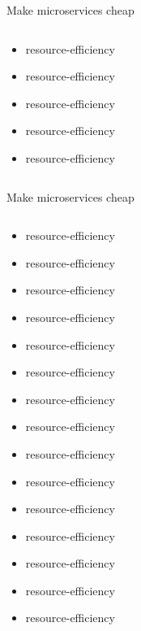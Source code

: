 \documentclass{beamer}
\begin{document}
\begin{frame}{Make microservices cheap}
\begin{columns}
\begin{column}{0.36\textwidth}
\begin{itemize}
                \item resource-efficiency
                \item resource-efficiency
                \item resource-efficiency
                \item resource-efficiency
                \item resource-efficiency
            \end{itemize}
        \end{column}
        \begin{column}{0.36\textwidth}
        \end{column}
    \end{columns}
\end{frame}
\begin{frame}{Make microservices cheap}
    \begin{columns}
        \begin{column}{0.36\textwidth}
            \begin{itemize}
                \item resource-efficiency
                \item resource-efficiency
                \item resource-efficiency
                \item resource-efficiency
                \item resource-efficiency
                \item resource-efficiency
                \item resource-efficiency
                \item resource-efficiency
                \item resource-efficiency
                \item resource-efficiency
                \item resource-efficiency
                \item resource-efficiency
                \item resource-efficiency
                \item resource-efficiency
                \item resource-efficiency
            \end{itemize}
        \end{column}
        \begin{column}{0.36\textwidth}
            \begin{itemize}

\end{itemize}
\end{column}
\end{columns}
\end{frame}
\end{document}
